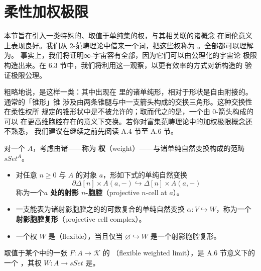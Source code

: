 \providecommand{\hciso}{\mathbb{I}}   %
\providecommand{\csp}{\cdot\!\lrcorner}   %
\providecommand{\qcOne}{\mathbf{1}}   %
\providecommand{\qcTwo}{\mathbf{2}}   %

\section{柔性加权极限}\label{sec:flexible-weighted-limits}

本节旨在引入一类特殊的、取值于单纯集的权，与其相关联的诸\trWeightedLimit{}概念
在同伦意义上表现良好。我们从 2-范畴理论中借来一个词，把这些权称为%
\emph{\trFlexible}。全部\trCosmologicalLimitNotions{}都可以理解为\trFlexibleWeightedLimit{}。
事实上，我们将证明∞-宇宙容有全部\trFlexibleWeightedLimit{}，因为它们可以由公理化的宇宙论
极限构造出来。在 6.3 节中，我们将利用这一观察，以更有效率的方式对新构造的%
\trInfinityCosmos{}验证极限公理。

粗略地说，\trFlexibleWeightedLimit{}是这样一类\trSimpliciallyEnrichedLimit：其中出现在%
\trCone{}里的诸单纯形，相对于\trDiagram{}形状是自由附接的。通常的「锥形」锥
涉及由两条锥腿与\trDiagram{}中一支箭头构成的交换三角形。这种交换性在柔性权所
规定的锥形状中是不被允许的；取而代之的是，一个由 0-箭头构成的\trDiagram{}可以
在更高维胞腔存在的意义下交换。若你对富集范畴理论中的加权极限概念还不熟悉，
我们建议在继续之前先阅读 A.4 节至 A.6 节。

\begin{definition}[作为射影胞腔复形的柔性权]\label{def:flexible-weights}
对一个\trSimplicialCategory{} $A$，考虑由诸\trSimplicialFunctor{}——称为%
\textbf{权}（weight）——与诸单纯自然变换构成的范畴 $sSet^{A}$。
\begin{itemize}
\item 对任意 $n\geq 0$ 与 $A$ 的对象 $a$，形如下式的单纯自然变换
\[
\partial\Delta[n]\times A(a,-)\hookrightarrow\Delta[n]\times A(a,-)
\]
称为一个\textbf{$a$ 处的射影 $n$-胞腔}（projective $n$-cell at $a$）。
\item 一支能表为诸射影胞腔之\trCoproduct{}的\trPushout{}的可数复合的单纯自然变换
$\alpha\colon V\hookrightarrow W$，称为一个\textbf{射影胞腔复形}（projective
cell complex）。
\item 一个权 $W$ 是\textbf{\trFlexible}（flexible），当且仅当
$\varnothing\hookrightarrow W$ 是一个射影胞腔复形。
\end{itemize}
取值于某个\trInfinityCosmos{}中的一张\trDiagram{} $F\colon A\to\mathcal{K}$ 的%
\textbf{\trFlexibleWeightedLimit}（flexible weighted limit），是 A.6 节意义下的一个%
\trWeightedLimit，其权 $W\colon A\to sSet$ 是\trFlexible。
\end{definition}

